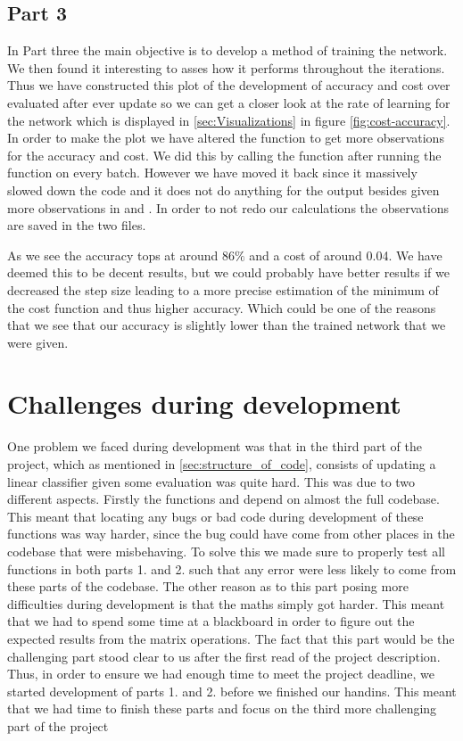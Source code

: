 \documentclass[a4paper,oneside,article,english]{memoir}
\begin{document}
\subsection{Part 3}
In Part three the main objective is to develop a method of training the network.
We then found it interesting to asses how it performs throughout the iterations.
Thus we have constructed this plot of the development of accuracy and cost over
evaluated after ever update so we can get a closer look at the rate of learning
for the network which is displayed in \ref{sec:Visualizations} in figure
\ref{fig:cost-accuracy}. In order to make the plot we have altered the
 function to get more observations for the accuracy and
cost. We did this by calling the  function after
running the  function on every batch. However we have
moved it back since it massively slowed down the code and it does not do
anything for the output besides given more observations in
 and . In order to not redo
our calculations the observations are saved in the two  files.

As we see the accuracy tops at around $86\%$ and a cost of around 0.04. We have deemed this to be decent results, but we could probably have better results if we decreased the step size leading to a more precise estimation of the minimum of the cost function and thus higher accuracy. Which could be one of the reasons that we see that our accuracy is slightly lower than the trained network that we were given.


\section{Challenges during development}  
\label{sec:challenges_during_development}

One problem we faced during development was that in the third part of the
project, which as mentioned in \cref{sec:structure_of_code}, consists of
updating a linear classifier given some evaluation was quite hard. This was due
to two different aspects. Firstly the functions  and
 depend on almost the full codebase. This meant that
locating any bugs or bad code during development of these functions was way
harder, since the bug could have come from other places in the codebase that
were misbehaving. To solve this we made sure to properly test all functions in
both parts 1. and 2. such that any error were less likely to come from these
parts of the codebase. The other reason as to this part posing more
difficulties during development is that the maths simply got harder. This meant
that we had to spend some time at a blackboard in order to figure out the
expected results from the matrix operations. The fact that this part would be
the challenging part stood clear to us after the first read of the project
description. Thus, in order to ensure we had enough time to meet the project
deadline, we started development of parts 1. and 2. before we finished our
handins. This meant that we had time to finish these parts and focus on the
third more challenging part of the project 
\end{document}
